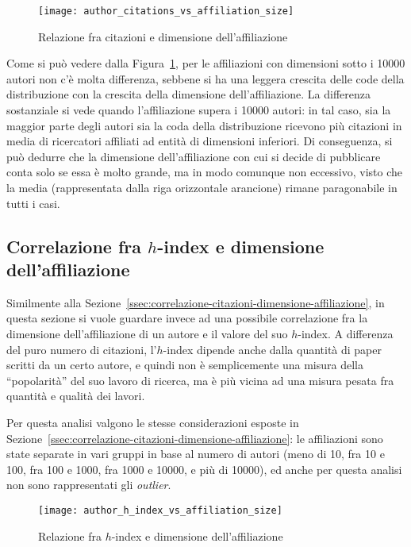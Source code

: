 \begin{figure}[tb]
  \texttt{[image: author\_citations\_vs\_affiliation\_size]}
  \caption{Relazione fra citazioni e dimensione dell'affiliazione}
  \label{fig:author-citations-vs-affiliation-size}
\end{figure}

Come si può vedere dalla Figura~\ref{fig:author-citations-vs-affiliation-size},
per le affiliazioni con dimensioni sotto i 10000 autori non c'è molta differenza,
sebbene si ha una leggera crescita delle code della distribuzione con la crescita
della dimensione dell'affiliazione.
La differenza sostanziale si vede quando l'affiliazione supera i 10000 autori:
in tal caso, sia la maggior parte degli autori sia la coda della distribuzione
ricevono più citazioni in media di ricercatori affiliati ad entità di dimensioni
inferiori.
Di conseguenza, si può dedurre che la dimensione dell'affiliazione con cui
si decide di pubblicare conta solo se essa è molto grande, ma in modo comunque
non eccessivo, visto che la media (rappresentata dalla riga orizzontale
arancione) rimane paragonabile in tutti i casi.

\subsection{Correlazione fra $h$-index e dimensione dell'affiliazione}
\label{ssec:correlazione-h-index-dimensione-affiliazione}

Similmente alla Sezione~\ref{ssec:correlazione-citazioni-dimensione-affiliazione},
in questa sezione si vuole guardare invece ad una possibile correlazione fra la
dimensione dell'affiliazione di un autore e il valore del suo $h$-index.
A differenza del puro numero di citazioni, l'$h$-index dipende anche dalla
quantità di paper scritti da un certo autore, e quindi non è semplicemente una
misura della ``popolarità'' del suo lavoro di ricerca, ma è più vicina ad una
misura pesata fra quantità e qualità dei lavori.

Per questa analisi valgono le stesse considerazioni esposte in
Sezione~\ref{ssec:correlazione-citazioni-dimensione-affiliazione}: le affiliazioni
sono state separate in vari gruppi in base al numero di autori (meno di 10, fra
10 e 100, fra 100 e 1000, fra 1000 e 10000, e più di 10000), ed anche per questa
analisi non sono rappresentati gli \textit{outlier}.

\begin{figure}[tb]
  \texttt{[image: author\_h\_index\_vs\_affiliation\_size]}
  \caption{Relazione fra $h$-index e dimensione dell'affiliazione}
  \label{fig:author-h-index-vs-affiliation-size}
\end{figure}

